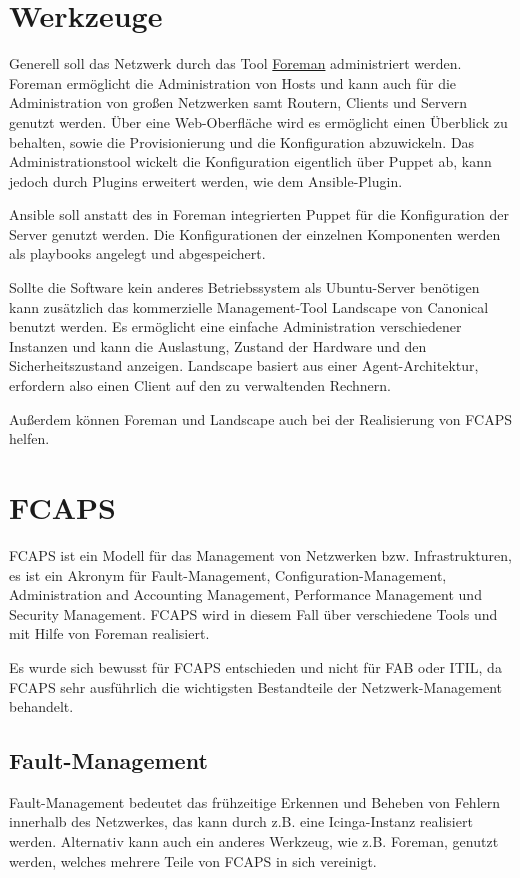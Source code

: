 \section{Werkzeuge}
Generell soll das Netzwerk durch das Tool \href{www.theforeman.org}{Foreman} administriert werden. Foreman ermöglicht die Administration von Hosts und kann auch für die Administration von großen Netzwerken samt Routern, Clients und Servern genutzt werden. Über eine Web-Oberfläche wird es ermöglicht einen Überblick zu behalten, sowie die Provisionierung und die Konfiguration abzuwickeln.
Das Administrationstool wickelt die Konfiguration eigentlich über Puppet ab, kann jedoch durch Plugins erweitert werden, wie dem Ansible-Plugin. 

Ansible soll anstatt des in Foreman integrierten Puppet für die Konfiguration der Server genutzt werden. Die Konfigurationen der einzelnen Komponenten werden als playbooks angelegt und abgespeichert.

Sollte die Software kein anderes Betriebssystem als Ubuntu-Server benötigen kann zusätzlich das kommerzielle Management-Tool Landscape von Canonical benutzt werden. Es ermöglicht eine einfache Administration verschiedener Instanzen und kann die Auslastung, Zustand der Hardware und den Sicherheitszustand anzeigen. Landscape basiert aus einer Agent-Architektur, erfordern also einen Client auf den zu verwaltenden Rechnern.

Außerdem können Foreman und Landscape auch bei der Realisierung von FCAPS helfen.

\newpage

\section{FCAPS}
FCAPS ist ein Modell für das Management von Netzwerken bzw. Infrastrukturen, es ist ein Akronym für Fault-Management, Configuration-Management, Administration and Accounting Management, Performance Management und Security Management. FCAPS wird in diesem Fall über verschiedene Tools und mit Hilfe von Foreman realisiert.

Es wurde sich bewusst für FCAPS entschieden und nicht für FAB oder ITIL, da FCAPS sehr ausführlich die wichtigsten Bestandteile der Netzwerk-Management behandelt.


\subsection{Fault-Management}
Fault-Management bedeutet das frühzeitige Erkennen und Beheben von Fehlern innerhalb des Netzwerkes, das kann durch z.B. eine Icinga-Instanz realisiert werden. Alternativ kann auch ein anderes Werkzeug, wie z.B. Foreman, genutzt werden, welches mehrere Teile von FCAPS in sich vereinigt.

